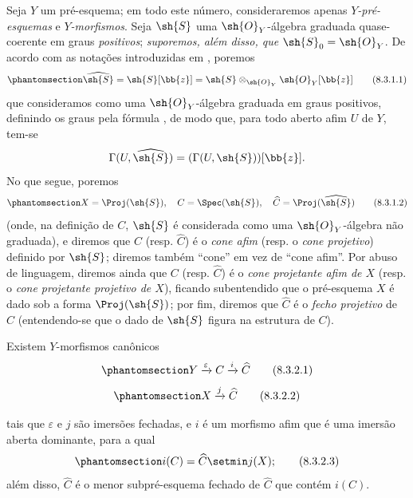 \documentclass[oneside,10pt]{amsart}
\newcommand{\oldpage}[2][]{\marginnote{\normalfont\footnotesize\textbf{#1}~|~#2}\ignorespaces}
\let\EGAOriginalLabel\label
\renewcommand{\label}[1]{\phantomsection\EGAOriginalLabel{#1}}
\begin{document}
\begin{env}[8.3.1]
\label{II.8.3.1}
Seja $Y$ um pré-esquema;
em todo este número, consideraremos apenas \emph{$Y$-pré-esquemas} e \emph{$Y$-morfismos}.
Seja $\sh{S}$ uma $\sh{O}_Y$-álgebra graduada quase-coerente em graus \emph{positivos};
\emph{suporemos, além disso, que $\sh{S}_0=\sh{O}_Y$}.
De acordo com as notações introduzidas em , poremos
\[
\label{II.8.3.1.1}
  \widehat{\sh{S}} = \sh{S}[\bb{z}] = \sh{S} \otimes_{\sh{O}_Y} \sh{O}_Y[\bb{z}]
\tag{8.3.1.1}
\]
que consideramos como uma $\sh{O}_Y$-álgebra graduada em graus positivos, definindo os graus pela fórmula , de modo que, para todo aberto afim $U$ de $Y$, tem-se
\[
  \Gamma(U,\widehat{\sh{S}}) = (\Gamma(U,\sh{S}))[\bb{z}].
\]
No que segue, poremos
\[
\label{II.8.3.1.2}
  X = \Proj(\sh{S}),
  \quad
  C = \Spec(\sh{S}),
  \quad
  \widehat{C} = \Proj(\widehat{\sh{S}})
\tag{8.3.1.2}
\]
(onde, na definição de $C$, $\sh{S}$ é considerada como uma $\sh{O}_Y$-álgebra não graduada), e diremos que $C$ (resp. $\widehat{C}$) é o \emph{cone afim} (resp. o \emph{cone projetivo}) definido por $\sh{S}$;
diremos também ``cone'' em vez de ``cone afim''.
Por abuso de linguagem, diremos ainda que $C$ (resp. $\widehat{C}$) é o \emph{cone projetante afim de $X$} (resp. o \emph{cone projetante projetivo de $X$}), ficando subentendido que o pré-esquema $X$ é dado sob a forma $\Proj(\sh{S})$;
por fim, diremos que $\widehat{C}$ é o \emph{fecho projetivo} de $C$ (entendendo-se que o dado de $\sh{S}$ figura na estrutura de $C$).
\end{env}
\begin{proposition}[8.3.2]
\label{II.8.3.2}
Existem $Y$-morfismos canônicos
\[
\label{II.8.3.2.1}
  Y \xrightarrow{\varepsilon} C \xrightarrow{i} \widehat{C}
\tag{8.3.2.1}
\]
\[
\label{II.8.3.2.2}
  X \xrightarrow{j} \widehat{C}
\tag{8.3.2.2}
\]

\oldpage[II]{163}
tais que $\varepsilon$ e $j$ são imersões fechadas, e $i$ é um morfismo afim que é uma imersão aberta dominante, para a qual
\[
\label{II.8.3.2.3}
  i(C) = \widehat{C}\setmin j(X);
\tag{8.3.2.3}
\]
além disso, $\widehat{C}$ é o menor subpré-esquema fechado de $\widehat{C}$ que contém $i(C)$.
\end{proposition}
\end{document}
